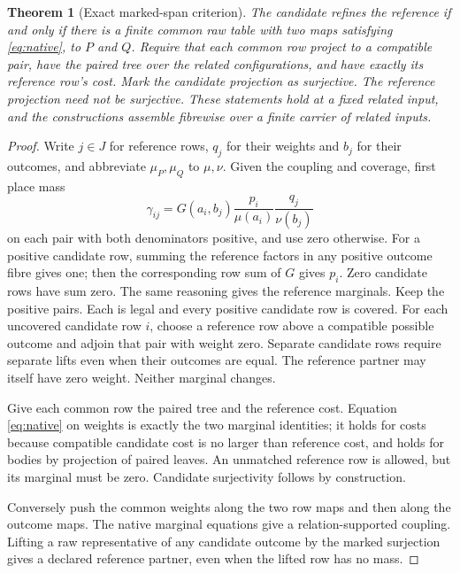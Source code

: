 \documentclass[11pt]{article}
\newtheorem{theorem}{Theorem}
\theoremstyle{definition}
\begin{document}
\begin{theorem}[Exact marked-span criterion]\label{thm:span}
The candidate refines the reference if and only if there is a finite
common raw table with two maps satisfying \eqref{eq:native}, to $P$
and $Q$. Require that each common row project to a compatible pair,
have the paired tree over the related configurations, and have exactly
its reference row's cost. Mark the candidate projection as surjective.
The reference projection need not be surjective. These statements hold
at a fixed related input, and the constructions assemble fibrewise
over a finite carrier of related inputs.
\end{theorem}
\begin{proof}
Write $j\in J$ for reference rows, $q_j$ for their weights and $b_j$
for their outcomes, and abbreviate $\mu_P,\mu_Q$ to $\mu,\nu$.
Given the coupling and coverage, first place mass
\[
 \gamma_{ij}=G(a_i,b_j)\frac{p_i}{\mu(a_i)}
                  \frac{q_j}{\nu(b_j)}
\]
on each pair with both denominators positive, and use zero otherwise.
For a positive candidate row, summing the reference factors in any
positive outcome fibre gives one; then the corresponding row sum of
$G$ gives $p_i$. Zero candidate rows have sum zero. The same reasoning
gives the reference marginals. Keep the positive pairs. Each is legal
and every positive candidate row is covered. For each uncovered
candidate row $i$, choose a reference row above a compatible possible
outcome and adjoin that pair with weight zero. Separate candidate rows
require separate lifts even when their outcomes are equal. The
reference partner may itself have zero weight. Neither marginal changes.

Give each common row the paired tree and the reference cost. Equation
\eqref{eq:native} on weights is exactly the two marginal identities;
it holds for costs because compatible candidate cost is no larger
than reference cost, and holds for bodies by projection of paired
leaves. An unmatched reference row is allowed, but its marginal must
be zero. Candidate surjectivity follows by construction.

Conversely push the common weights along the two row maps and then
along the outcome maps. The native marginal equations give a
relation-supported coupling. Lifting a raw representative of any
candidate outcome by the marked surjection gives a declared reference
partner, even when the lifted row has no mass.
\end{proof}
\end{document}
